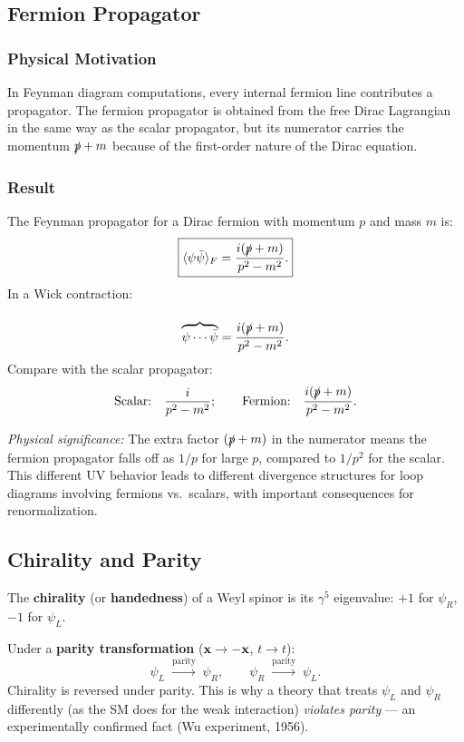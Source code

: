 \documentclass[../main.tex]{subfiles}
\begin{document}
\subsection*{Fermion Propagator}

\subsubsection*{Physical Motivation}

In Feynman diagram computations, every internal fermion line contributes a propagator.  The fermion propagator is obtained from the free Dirac Lagrangian in the same way as the scalar propagator, but its numerator carries the momentum $\slashed{p}+m$ because of the first-order nature of the Dirac equation.

\subsubsection*{Result}

The Feynman propagator for a Dirac fermion with momentum $p$ and mass $m$ is:
\begin{equation}
  \boxed{\langle\psi\bar\psi\rangle_F = \frac{i(\slashed{p}+m)}{p^2 - m^2}.}
  \label{eq:lec08:fermion-prop}
\end{equation}
In a Wick contraction:
\[
  \overbrace{\psi\cdots\bar\psi}^{\phantom{X}} = \frac{i(\slashed{p}+m)}{p^2-m^2}.
\]
Compare with the scalar propagator:
\[
  \text{Scalar:}\quad \frac{i}{p^2-m^2}; \qquad
  \text{Fermion:}\quad \frac{i(\slashed{p}+m)}{p^2-m^2}.
\]

\textit{Physical significance:} The extra factor $(\slashed{p}+m)$ in the numerator means the fermion propagator falls off as $1/p$ for large $p$, compared to $1/p^2$ for the scalar.  This different UV behavior leads to different divergence structures for loop diagrams involving fermions vs.\ scalars, with important consequences for renormalization.

\subsection*{Chirality and Parity}

The \textbf{chirality} (or \textbf{handedness}) of a Weyl spinor is its $\gamma^5$ eigenvalue: $+1$ for $\psi_R$, $-1$ for $\psi_L$.

Under a \textbf{parity transformation} ($\mathbf{x} \to -\mathbf{x}$, $t\to t$):
\begin{equation}
  \boxed{\psi_L \;\xrightarrow{\text{parity}}\; \psi_R, \qquad \psi_R \;\xrightarrow{\text{parity}}\; \psi_L.}
  \label{eq:lec08:chirality-parity}
\end{equation}
Chirality is reversed under parity.  This is why a theory that treats $\psi_L$ and $\psi_R$ differently (as the SM does for the weak interaction) \emph{violates parity} — an experimentally confirmed fact (Wu experiment, 1956).
\end{document}

